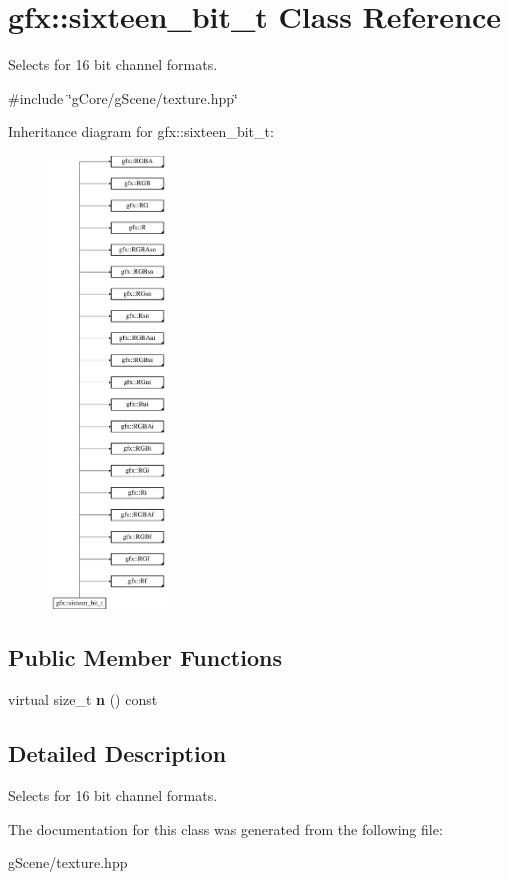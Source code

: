 \hypertarget{classgfx_1_1sixteen__bit__t}{\section{gfx\-:\-:sixteen\-\_\-bit\-\_\-t Class Reference}
\label{classgfx_1_1sixteen__bit__t}
}


Selects for 16 bit channel formats.  




{\ttfamily \#include \char`\"{}g\-Core/g\-Scene/texture.\-hpp\char`\"{}}

Inheritance diagram for gfx\-:\-:sixteen\-\_\-bit\-\_\-t\-:\begin{figure}[H]
\begin{center}
\leavevmode
\includegraphics[height=12.000000cm]{classgfx_1_1sixteen__bit__t}
\end{center}
\end{figure}
\subsection*{Public Member Functions}
\begin{DoxyCompactItemize}
\item 
\hypertarget{classgfx_1_1sixteen__bit__t_afe144cfd35419e5d7815905e99d37d65}{virtual size\-\_\-t {\bfseries n} () const }\label{classgfx_1_1sixteen__bit__t_afe144cfd35419e5d7815905e99d37d65}

\end{DoxyCompactItemize}


\subsection{Detailed Description}
Selects for 16 bit channel formats. 

The documentation for this class was generated from the following file\-:\begin{DoxyCompactItemize}
\item 
g\-Scene/texture.\-hpp\end{DoxyCompactItemize}
